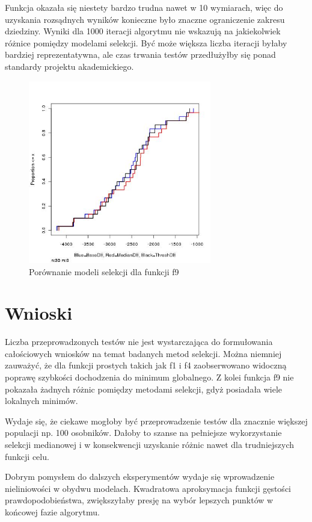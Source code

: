 \documentclass[11pt]{article}
\begin{document}
Funkcja okazała się niestety bardzo trudna nawet w 10 wymiarach, więc do uzyskania rozsądnych wyników konieczne było znaczne ograniczenie zakresu dziedziny.
Wyniki dla 1000 iteracji algorytmu nie wskazują na jakiekolwiek różnice pomiędzy modelami selekcji.
Być może większa liczba iteracji byłaby bardziej reprezentatywna, ale czas trwania testów przedłużyłby się ponad standardy projektu akademickiego.

\begin{figure}[ht]
\centering
\includegraphics[width=80mm]{cec2005_9.jpg}
\caption{Porównanie modeli selekcji dla funkcji f9}
\label{overflow}
\end{figure}

\section{Wnioski}
Liczba przeprowadzonych testów nie jest wystarczająca do formułowania całościowych wniosków na temat badanych metod selekcji.
Można niemniej zauważyć, że dla funkcji prostych takich jak f1 i f4 zaobserwowano widoczną poprawę szybkości dochodzenia do minimum globalnego.
Z kolei funkcja f9 nie pokazała żadnych różnic pomiędzy metodami selekcji, gdyż posiadała wiele lokalnych minimów.

Wydaje się, że ciekawe mogłoby być przeprowadzenie testów dla znacznie większej populacji np. 100 osobników.
Dałoby to szanse na pełniejsze wykorzystanie selekcji medianowej i w konsekwencji uzyskanie różnic nawet dla trudniejszych funkcji celu.

Dobrym pomysłem do dalszych eksperymentów wydaje się wprowadzenie nieliniowości w obydwu modelach.
Kwadratowa aproksymacja funkcji gęstości prawdopodobieństwa, zwiększyłaby presję na wybór lepszych punktów w końcowej fazie algorytmu.
\end{document}
